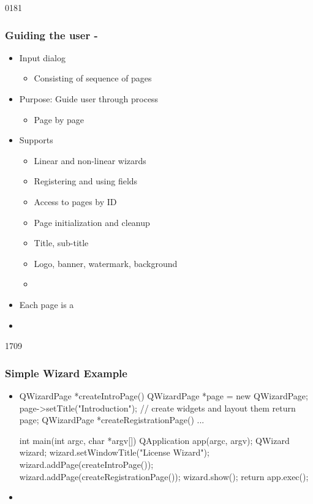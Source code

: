 \begin{slide}{0181}\frametitle{Guiding the user - }
\begin{itemize}
\item Input dialog
  \begin{itemize}
  \item Consisting of sequence of pages
  \end{itemize}
\item Purpose: Guide user through process
  \begin{itemize}
  \item Page by page
  \end{itemize}
\item Supports
  \begin{itemize}
  \item Linear and non-linear wizards
  \item Registering and using fields
  \item Access to pages by ID
  \item Page initialization and cleanup
  \item Title, sub-title
  \item Logo, banner, watermark, background
  \item {}
  \end{itemize}

\item Each page is a 
\item {}
\end{itemize}
\end{slide}

\begin{slide}[fragile]{1709}
  \frametitle{Simple Wizard Example}
  \begin{itemize}
  \item[]
    \begin{cpp}
QWizardPage *createIntroPage() {
  QWizardPage *page = new QWizardPage;
  page->setTitle("Introduction");
  // create widgets and layout them
  return page;
}
QWizardPage *createRegistrationPage() { ... }

int main(int argc, char *argv[]) {
  QApplication app(argc, argv); 
  QWizard wizard;
  wizard.setWindowTitle("License Wizard");
  wizard.addPage(createIntroPage());
  wizard.addPage(createRegistrationPage()); 
  wizard.show();
  return app.exec();
}      
    \end{cpp}

  \item {}
  \end{itemize}
\end{slide}

